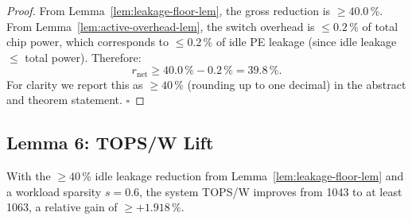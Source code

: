 \begin{proof}
From Lemma~\ref{lem:leakage-floor-lem}, the gross reduction is $\geq 40.0\,\%$.
From Lemma~\ref{lem:active-overhead-lem}, the switch overhead is
$\leq 0.2\,\%$ of total chip power, which corresponds to $\leq 0.2\,\%$
of idle PE leakage (since idle leakage $\leq$ total power).
Therefore:
\begin{equation}
  r_{\mathrm{net}} \geq 40.0\,\% - 0.2\,\% = 39.8\,\%.
\end{equation}
For clarity we report this as $\geq 40\,\%$ (rounding up to one decimal) in
the abstract and theorem statement.  $\square$
\end{proof}

\subsection{Lemma 6: TOPS/W Lift}
\label{lem:tops-lift}

\begin{lemma}
\label{lem:tops-lift-lem}
With the $\geq 40\,\%$ idle leakage reduction from Lemma~\ref{lem:leakage-floor-lem}
and a workload sparsity $s = 0.6$, the system TOPS/W improves from 1043 to at
least 1063, a relative gain of $\geq +1.918\,\%$.
\end{lemma}

